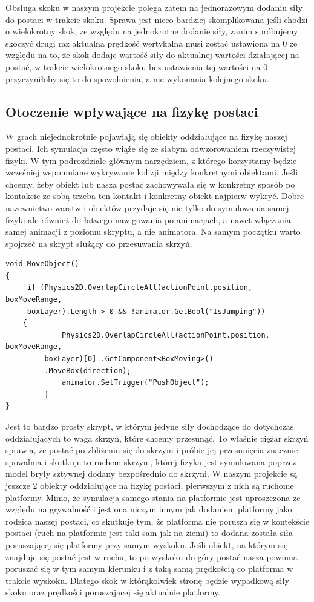 \documentclass[oneside,polski,logo]{amuthesis}
\begin{document}
Obsługa skoku w naszym projekcie polega zatem na jednorazowym dodaniu siły do postaci w trakcie skoku. Sprawa jest nieco bardziej skomplikowana jeśli chodzi o wielokrotny skok, ze względu na jednokrotne dodanie siły, zanim spróbujemy skoczyć drugi raz aktualna prędkość wertykalna musi zostać ustawiona na 0 ze względu na to, że skok dodaje wartość siły do aktualnej wartości działającej na postać, w trakcie wielokrotnego skoku bez ustawienia tej wartości na 0 przyczyniłoby się to do spowolnienia, a nie wykonania kolejnego skoku.
\subsection{Otoczenie wpływające na fizykę postaci}
W grach niejednokrotnie pojawiają się obiekty oddziałujące na fizykę naszej postaci. Ich symulacja często wiąże się ze słabym odwzorowaniem rzeczywistej fizyki. W tym podrozdziale głównym narzędziem, z którego korzystamy będzie wcześniej wspomniane wykrywanie kolizji między konkretnymi obiektami. Jeśli chcemy, żeby obiekt lub nasza postać zachowywała się w konkretny sposób po kontakcie ze sobą trzeba ten kontakt i konkretny obiekt najpierw wykryć. Dobre nazewnictwo warstw i obiektów przydaje się nie tylko do symulowania samej fizyki ale również do łatwego nawigowania po animacjach, a nawet włączania samej animacji z poziomu skryptu, a nie animatora. Na samym początku warto spojrzeć na skrypt służący do przesuwania skrzyń.

\begin{lstlisting}[breaklines=true,
language={[Sharp]C},
rulecolor=\color{blue!80!black},
caption={Fragment klasy \texttt{PlayerMovement.cs}}
]
void MoveObject()
{
	 if (Physics2D.OverlapCircleAll(actionPoint.position, boxMoveRange, 
	 boxLayer).Length > 0 && !animator.GetBool("IsJumping"))
	{
           	 Physics2D.OverlapCircleAll(actionPoint.position, boxMoveRange,
		 boxLayer)[0] .GetComponent<BoxMoving>()
		 .MoveBox(direction);
           	 animator.SetTrigger("PushObject");
      	 }
}
\end{lstlisting}

Jest to bardzo prosty skrypt, w którym jedyne siły dochodzące do dotychczas oddziałujących to waga skrzyń, które chcemy przesunąć. To właśnie ciężar skrzyń sprawia, że postać po zbliżeniu się do skrzyni i próbie jej przesunięcia znacznie spowalnia i skutkuje to ruchem skrzyni, której fizyka jest symulowana poprzez model bryły sztywnej dodany bezpośrednio do skrzyni.
W naszym projekcie są jeszcze 2 obiekty oddziałujące na fizykę postaci, pierwszym z nich są ruchome platformy. Mimo, że symulacja samego stania na platformie jest uproszczona ze względu na grywalność i jest ona niczym innym jak dodaniem platformy jako rodzica naszej postaci, co skutkuje tym, że platforma nie porusza się w kontekście postaci (ruch na platformie jest taki sam jak na ziemi) to dodana została siła poruszającej się platformy przy samym wyskoku. Jeśli obiekt, na którym się znajduje się postać jest w ruchu, to po wyskoku do góry postać nasza powinna poruszać się w tym samym kierunku i z taką samą prędkością co platforma w trakcie wyskoku. Dlatego skok w którąkolwiek stronę będzie wypadkową siły skoku oraz prędkości poruszającej się aktualnie platformy.
\end{document}
